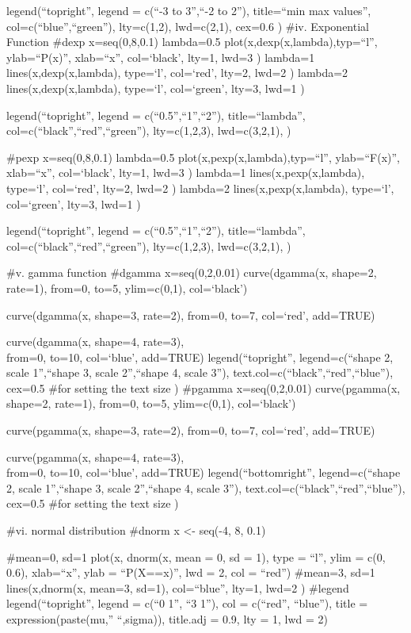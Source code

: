 \documentclass[
]{article}
\begin{document}
legend(``topright'', legend = c(``-3 to 3'',``-2 to 2''), title=``min
max values'', col=c(``blue'',``green''), lty=c(1,2), lwd=c(2,1), cex=0.6
) \#iv. Exponential Function \#dexp x=seq(0,8,0.1) lambda=0.5
plot(x,dexp(x,lambda),typ=``l'', ylab=``P(x)'', xlab=``x'', col=`black',
lty=1, lwd=3 ) lambda=1 lines(x,dexp(x,lambda), type=`l', col=`red',
lty=2, lwd=2 ) lambda=2 lines(x,dexp(x,lambda), type=`l', col=`green',
lty=3, lwd=1 )

legend(``topright'', legend = c(``0.5'',``1'',``2''), title=``lambda'',
col=c(``black'',``red'',``green''), lty=c(1,2,3), lwd=c(3,2,1), )

\#pexp x=seq(0,8,0.1) lambda=0.5 plot(x,pexp(x,lambda),typ=``l'',
ylab=``F(x)'', xlab=``x'', col=`black', lty=1, lwd=3 ) lambda=1
lines(x,pexp(x,lambda), type=`l', col=`red', lty=2, lwd=2 ) lambda=2
lines(x,pexp(x,lambda), type=`l', col=`green', lty=3, lwd=1 )

legend(``topright'', legend = c(``0.5'',``1'',``2''), title=``lambda'',
col=c(``black'',``red'',``green''), lty=c(1,2,3), lwd=c(3,2,1), )

\#v. gamma function \#dgamma x=seq(0,2,0.01) curve(dgamma(x, shape=2,
rate=1), from=0, to=5, ylim=c(0,1), col=`black')

curve(dgamma(x, shape=3, rate=2), from=0, to=7, col=`red', add=TRUE)

curve(dgamma(x, shape=4, rate=3),\\
from=0, to=10, col=`blue', add=TRUE) legend(``topright'',
legend=c(``shape 2, scale 1'',``shape 3, scale 2'',``shape 4, scale
3''), text.col=c(``black'',``red'',``blue''), cex=0.5 \#for setting the
text size ) \#pgamma x=seq(0,2,0.01) curve(pgamma(x, shape=2, rate=1),
from=0, to=5, ylim=c(0,1), col=`black')

curve(pgamma(x, shape=3, rate=2), from=0, to=7, col=`red', add=TRUE)

curve(pgamma(x, shape=4, rate=3),\\
from=0, to=10, col=`blue', add=TRUE) legend(``bottomright'',
legend=c(``shape 2, scale 1'',``shape 3, scale 2'',``shape 4, scale
3''), text.col=c(``black'',``red'',``blue''), cex=0.5 \#for setting the
text size )

\#vi. normal distribution \#dnorm x \textless- seq(-4, 8, 0.1)

\#mean=0, sd=1 plot(x, dnorm(x, mean = 0, sd = 1), type = ``l'', ylim =
c(0, 0.6), xlab=``x'', ylab = ``P(X==x)'', lwd = 2, col = ``red'')
\#mean=3, sd=1 lines(x,dnorm(x, mean=3, sd=1), col=``blue'', lty=1,
lwd=2 ) \#legend legend(``topright'', legend = c(``0 1'', ``3 1''), col
= c(``red'', ``blue''), title = expression(paste(mu,'' ``,sigma)),
title.adj = 0.9, lty = 1, lwd = 2)
\end{document}
